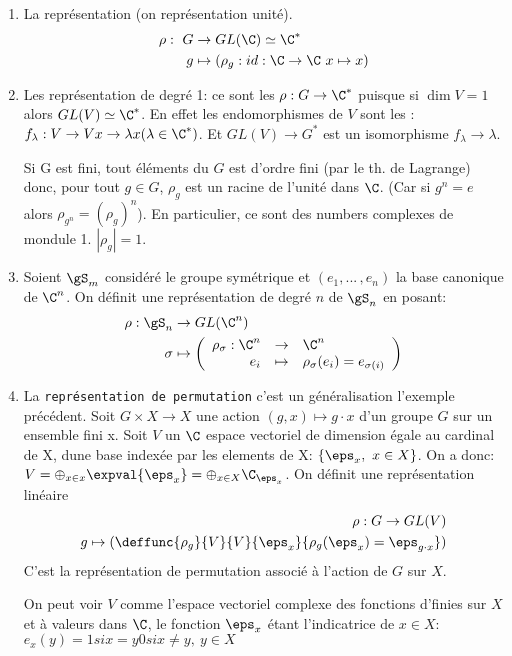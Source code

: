 \begin{examplebox}
	\begin{enumerate}
	\leavevmode
		\item La représentation  (on représentation unité).
		\begin{align*}
			\rho:\ G &\rightarrow GL(\C)\simeq\C^\ast\\
			g &\mapsto (\rho_g: id:\C\rightarrow \C\ x\mapsto x)
		\end{align*}
		\item Les représentation de degré 1: ce sont les  $\rho:G\rightarrow \C^\ast$ puisque si $\dim V= 1$ alors $GL(V)\simeq\C^\ast$.
		En effet les endomorphismes de $V$ sont les : $f_\lambda: V\rightarrow V x\rightarrow \lambda x(\lambda\in \C^\ast)$. Et $GL(V)\rightarrow  G^\ast$ est un isomorphisme $f_\lambda\rightarrow \lambda$.
		
		Si G est fini, tout éléments du $G$ est d'ordre fini (par le th. de Lagrange) donc, pour tout $g \in G$, $\rho_g$ est un racine de l'unité dans $\C$.
		(Car si $g^n=e$ alors $\rho_{g^n}=(\rho_g)^n$). En particulier, ce sont des numbers complexes de mondule 1. $|\rho_g|=1$.
		\item Soient $\gS_m$ considéré le groupe symétrique et $(e_1,...\,, e_n)$ la base canonique de $\C^n$. On définit une représentation de degré $n$ de $\gS_n$ en posant:
		\begin{align*}
			\rho:\gS_n &\rightarrow GL(\C^n) \\
			\sigma &\mapsto \left(
				\begin{array}{rcl} \rho_\sigma: \C^n &\rightarrow&  \C^n \\ e_i &\mapsto& \rho_\sigma(e_i)=e_{\sigma(i)} \end{array}
			\right)
		\end{align*}
		\item La \texttt{représentation de permutation} c'est un généralisation l'exemple précédent. Soit $G\times X\rightarrow X$ une action $(g,x)\mapsto g\cdot x$ d'un groupe $G$ sur un ensemble fini x. Soit $V$ un $\C$ espace vectoriel de dimension égale au cardinal de X, dune base indexée par les elements de X: $\{\eps_x,\ x\in X\}$. On a donc: $V=\oplus_{x\in x}\expval{\eps_x}=\oplus_{x\in X}\C_{\eps_x}$. On définit une représentation linéaire
		\begin{align*}
		\rho: G\rightarrow  GL(V)\\
		g\mapsto(\deffunc{\rho_g}{V}{V}{\eps_x}{\rho_g(\eps_x)=\eps_{g\cdot x}})
		\end{align*}
		C'est la représentation de permutation associé à l'action de $G$ sur $X$.
		\begin{remark}
			On peut voir $V$ comme l'espace vectoriel complexe des fonctions d'finies sur $X$ et à valeurs dans $\C$, le fonction $\eps_x$ étant l'indicatrice de $x\in X$: $e_x(y)=1 si x=y 0 si x\neq y,\ y\in X$
		\end{remark}
		

\end{enumerate}
\end{examplebox}
